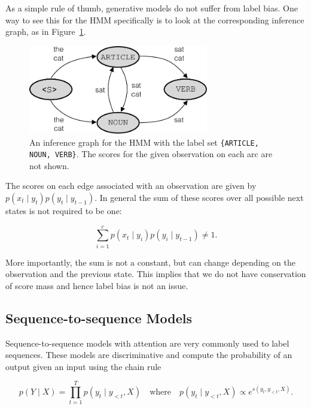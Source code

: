\documentclass[11pt, letterpaper]{article}
\begin{document}
As a simple rule of thumb, generative models do not suffer from label bias. One
way to see this for the HMM specifically is to look at the corresponding
inference graph, as in Figure~\ref{fig:hmm_inference}.

\begin{figure}
    \centering
    \includegraphics[width=0.7\textwidth]{figures/hmm_inference.pdf}
    \caption{An inference graph for the HMM with the label set
    \texttt{\{ARTICLE, NOUN, VERB\}}. The scores for the given observation on
    each arc are not shown.}
    \label{fig:hmm_inference}
\end{figure}

The scores on each edge associated with an observation are given by $p(x_t
\mid y_t) p(y_t \mid y_{t-1})$. In general the sum of these scores over all
possible next states is not required to be one:

\begin{equation}
\sum_{i=1}^c p(x_t \mid y_i) p(y_i \mid y_{t-1}) \ne 1.
\end{equation}

More importantly, the sum is not a constant, but can change depending on the
observation and the previous state. This implies that we do not have
conservation of score mass and hence label bias is not an issue.

\subsection{Sequence-to-sequence Models}

Sequence-to-sequence models with attention are very commonly used to label
sequences. These models are discriminative and compute the probability of an
output given an input using the chain rule

\begin{equation}
    p(Y \mid X) = \prod_{t=1}^T p(y_t \mid y_{<t}, X)
      \quad \textrm{where} \quad p(y_t \mid y_{<t}, X) \propto e^{s(y_t, y_{<t}, X)}.
\end{equation}
\end{document}
